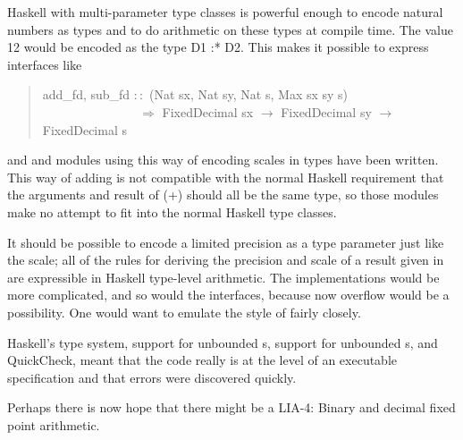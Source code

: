 \documentclass[prodmode,acmtoplas]{acmsmall}
\begin{document}
Haskell with multi-parameter type classes is powerful enough to
encode natural numbers as types and to do arithmetic on these types
at compile time.  The value 12 would be encoded as the type D1 :* D2.
This makes it possible to express interfaces like
\begin{quote}
\begin{tabbing}
\sffamily add\_fd, sub\_fd $::$ (Nat sx, Nat sy, Nat s, Max sx sy s)\\
\verb|               |\sffamily               $\Rightarrow$ FixedDecimal sx $\rightarrow$ FixedDecimal sy $\rightarrow$ FixedDecimal s
\end{tabbing}
\end{quote}
and  and  modules using this way
of encoding scales in types have been written.  This way of adding is
not compatible with the normal Haskell requirement that the arguments
and result of (+) should all be the same type, so those modules make
no attempt to fit into the normal Haskell type classes.

It should be possible to encode a limited precision
as a type parameter just like the scale; all of the rules for deriving
the precision and scale of a result given in \cite{PLI} are expressible
in Haskell type-level arithmetic.  The implementations would be more
complicated, and so would the interfaces, because now overflow would
be a possibility.  One would want to emulate the style of \cite{LIA1}
fairly closely.

Haskell's type system, support for unbounded s, support
for unbounded s, and QuickCheck, meant that the code
really is at the level of an executable specification and that errors
were discovered quickly.

Perhaps there is now hope that there might be a LIA-4: Binary and
decimal fixed point arithmetic.
\end{document}
